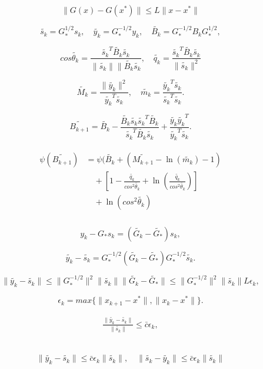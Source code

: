 \documentclass[12pt]{article}
\newcommand{\noi}{\noindent}
\begin{document}
\noi{\bf 1}
\\
 \[ \|G(x) - G(x^*)\| \leq L \| x - x^* \|\]
 
 \[ \tilde{s_k} = G_{*}^{1/2}s_k, \quad \tilde{y_k} = G_{*}^{-1/2}y_k, \quad \tilde{B_k} = G_{*}^{-1/2} B_k G_{*}^{1/2},\]
 
 \[ cos \tilde{\theta_k} = \frac{\tilde{s_k}^T \tilde{B_k} \tilde{s_k}}{\|\tilde{s_k}\| \|\tilde{B_k} \tilde{s_k}},\quad \tilde{q_k} = \frac{\tilde{s_k}^T \tilde{B_k} \tilde{s_k}}{\|\tilde{s_k}\|^2}\]
 
 \[ \tilde{M_k} = \frac{\| \tilde{y_k} \|^2}{\tilde{y_k}^T \tilde{s_k}},\quad \tilde{m_k} = \frac{\tilde{y_k}^T \tilde{s_k} }{\tilde{s_k}^T \tilde{s_k}}.\]
  
\[ \tilde{B_{k+1}} = \tilde{B_{k}} - \frac{\tilde{B_{k}} \tilde{s_{k}} \tilde{s_{k}}^T \tilde{B_{k}}}{\tilde{s_{k}}^T \tilde{B_{k}} \tilde{s_{k}}} + \frac{\tilde{y_{k}} \tilde{y_{k}}^T }{\tilde{y_{k}}^T \tilde{s_{k}}}.\]

\begin{eqnarray}  \label{6.53}
\begin{split}
\psi(\tilde{B_{k+1}}) & = \psi(\tilde{B_{k}} + (\tilde{M_{k+1}} - \ln(\tilde{m_{k}}) -1)\\
& \quad + \left[ 1 - \frac{\tilde{q_k}}{cos^2 \tilde{\theta_k}} + \ln\left(\frac{\tilde{q_k}}{cos^2 \tilde{\theta_k}} \right) \right]\\
& \quad + \ln\left(cos^2 \tilde{\theta_k} \right)\\
\end{split}
\end{eqnarray}

\[ y_k - G_{*} s_k = (\tilde{G_k} - \tilde{G_{*}}) s_k,\]

\[ \tilde{y_k} - \tilde{s_k} = G_{*}^{-1/2} (\tilde{G_k} - \tilde{G_{*}}) G_{*}^{-1/2} \tilde{s_k}.\]

\[ \|\tilde{y_k} - \tilde{s_k}\| \leq \|G_{*}^{-1/2}\|^2 \|\tilde{s_k}\| \|\tilde{G_k} - \tilde{G_{*}}\| \leq \|G_{*}^{-1/2}\|^2 \|\tilde{s_k}\| L\epsilon_k,\]

\[ \epsilon_k = max\{ \|x_{k+1} - x^*\|, \|x_{k} - x^*\|\}.\]

\begin{eqnarray}  \label{6.54}
\frac{\|\tilde{y_k} - \tilde{s_k}\|}{\| \tilde{s_k}\|} \leq \bar{c} \epsilon_k,
\end{eqnarray}



\noi{\bf 2}
\\
\[
\| \tilde{y_{k}} -  \tilde{s_{k}} \| \leq \bar{c} \epsilon_k \| \tilde{s_{k}} \|, \quad \| \tilde{s_{k}} - \tilde{y_{k}}  \| \leq \bar{c} \epsilon_k \| \tilde{s_{k}} \|
\]
\end{document}

